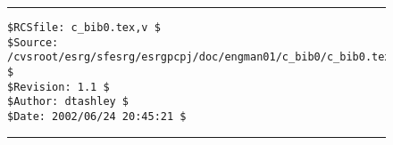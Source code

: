 \noindent\begin{figure}[!b]
\noindent\rule[-0.25in]{\textwidth}{1pt}
\begin{tiny}
\begin{verbatim}
$RCSfile: c_bib0.tex,v $
$Source: /cvsroot/esrg/sfesrg/esrgpcpj/doc/engman01/c_bib0/c_bib0.tex,v $
$Revision: 1.1 $
$Author: dtashley $
$Date: 2002/06/24 20:45:21 $
\end{verbatim}
\end{tiny}
\noindent\rule[0.25in]{\textwidth}{1pt}
\end{figure}
%
